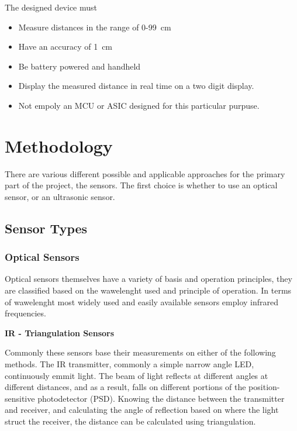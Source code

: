 \documentclass[12pt, a4paper]{article}
\begin{document}
            \noindent The designed device must
            \begin{itemize}
                \item Measure distances in the range of 0-99\SI{}{\centi\metre}
                \item Have an accuracy of \SI{1}{\centi\metre}
                \item Be battery powered and handheld
                \item Display the measured distance in real time on a two digit display.
                \item Not empoly an MCU or ASIC designed for this particular purpuse.
            \end{itemize}

        
            
            
    \pagebreak
    \section{Methodology}
        There are various different possible and applicable approaches for the primary part of the project, the sensors. The first choice is whether to use an optical sensor, or an ultrasonic sensor.

        \subsection{Sensor Types}

            \subsubsection{Optical Sensors}
                Optical sensors themselves have a variety of basis and operation principles, they are classified based on the wawelenght used and principle of operation. In terms of wawelenght most widely used and easily available sensors employ infrared frequencies. 


                \bigskip\noindent
                \textbf{IR - Triangulation Sensors}

                    Commonly these sensors base their measurements on either of the following methods. The IR transmitter, commonly a simple narrow angle LED, continuously emmit light. The beam of light reflects at different angles at different distances, and as a result, falls on different portions of the position-sensitive photodetector (PSD). Knowing the distance between the transmitter and receiver, and calculating the angle of reflection based on where the light struct the receiver, the distance can be calculated using triangulation.
\end{document}
